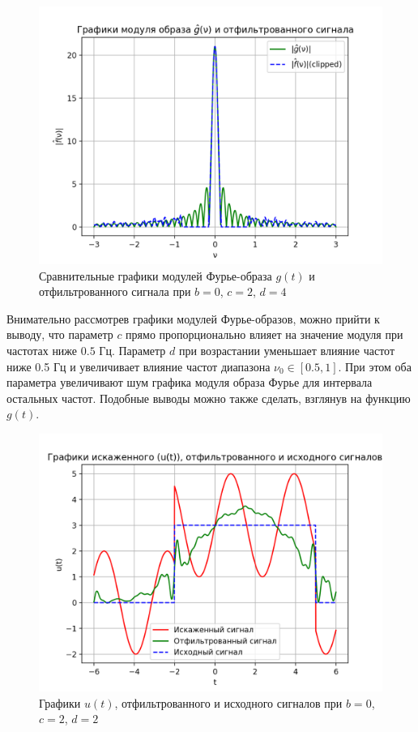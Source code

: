 \begin{figure}[ht!]
    \centering
    \includegraphics[scale=0.55]{media/1 task/specific_freq/Fourier_Image_Comparison_0_2_4_-0,805:-0,156.png}
    \caption{Сравнительные графики модулей Фурье-образа $g(t)$ и отфильтрованного сигнала при  $b=0$,  $c=2$,  $d=4$}
    \label{fig:fourc_0_2_4}
\end{figure}

Внимательно рассмотрев графики модулей Фурье-образов, можно прийти к выводу, что параметр $c$ прямо пропорционально влияет на значение модуля при частотах ниже $0.5$ Гц. Параметр $d$ при возрастании уменьшает влияние частот ниже 0.5 Гц и увеличивает влияние частот диапазона $\nu_0 \in[0.5, 1]$. При этом оба параметра увеличивают шум графика модуля образа Фурье для интервала остальных частот. Подобные выводы можно также сделать, взглянув на функцию $g(t)$.

\begin{figure}[ht!]
    \centering
    \includegraphics[scale=0.85]{media/1 task/specific_freq/Cleaned_0_2_2_-0,805:-0,156.png}
    \caption{Графики  $u(t)$, отфильтрованного и исходного сигналов при $b=0$,  $c=2$,  $d=2$}
    \label{fig:cleaned_0_2_2}
\end{figure}

